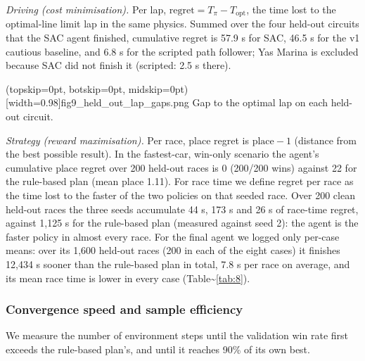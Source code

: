 \documentclass{ieeeaccess}
\begin{document}
\emph{Driving (cost minimisation).} Per lap, \(\text{regret}=T_\pi-T_{\text{opt}}\), the time
lost to the optimal-line limit lap in the same physics. Summed over the four
held-out circuits that the SAC agent finished, cumulative regret is 57.9 s for SAC,
46.5 s for the v1 cautious baseline, and 6.8 s for the scripted path follower; Yas
Marina is excluded because SAC did not finish it (scripted: 2.5 s there).

\Figure[t!](topskip=0pt, botskip=0pt, midskip=0pt)[width=0.98\columnwidth]{fig9_held_out_lap_gaps.png}
{Gap to the optimal lap on each held-out circuit.\label{fig:fig9_held_out_lap_gaps}}

\emph{Strategy (reward maximisation).} Per race, place regret is \(\text{place}-1\)
(distance from the best possible result). In the fastest-car, win-only scenario the
agent's cumulative place regret over 200 held-out races is 0 (200/200 wins) against
22 for the rule-based plan (mean place 1.11). For race time we define regret per
race as the time lost to the faster of the two policies on that seeded race. Over
200 clean held-out races the three seeds accumulate 44 s, 173 s and 26 s of
race-time regret, against 1,125 s for the rule-based plan (measured against seed
2): the agent is the faster policy in almost every race. For the final agent we
logged only per-case means: over its 1,600 held-out races (200 in each of the eight
cases) it finishes 12,434 s sooner than the rule-based plan in total, 7.8 s per
race on average, and its mean race time is lower in every case (Table\textasciitilde{}\ref{tab:8}).

\subsubsection{Convergence speed and sample efficiency}

We measure the number of environment steps until the validation win rate first
exceeds the rule-based plan's, and until it reaches 90\% of its own best.
\end{document}
